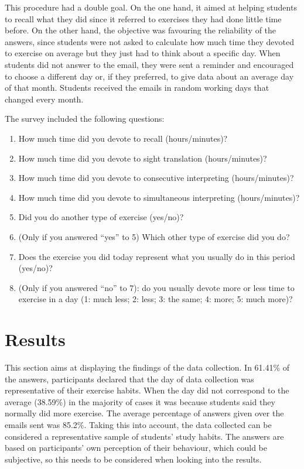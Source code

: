 \documentclass[output=paper]{../langscibook}
\begin{document}
This procedure had a double goal. On the one hand, it aimed at helping students to recall what they did since it referred to exercises they had done little time before. On the other hand, the objective was favouring the reliability of the answers, since students were not asked to calculate how much time they devoted to exercise on average but they just had to think about a specific day. When students did not answer to the email, they were sent a reminder and encouraged to choose a different day or, if they preferred, to give data about an average day of that month. Students received the emails in random working days that changed every month.

The survey included the following questions:

\begin{enumerate}[noitemsep]
\item How much time did you devote to recall (hours/minutes)?
\item How much time did you devote to sight translation (hours/minutes)?
\item How much time did you devote to consecutive interpreting (hours/minutes)?
\item How much time did you devote to simultaneous interpreting (hours/minutes)?
\item Did you do another type of exercise (yes/no)?
\item (Only if you answered ``yes'' to 5) Which other type of exercise did you do?
\item Does the exercise you did today represent what you usually do in this period (yes/no)?
\item (Only if you answered ``no'' to 7): do you usually devote more or less time to exercise in a day (1: much less; 2: less; 3: the same; 4: more; 5: much more)?
\end{enumerate}



\section{Results}


This section aims at displaying the findings of the data collection. In 61.41\% of the answers, participants declared that the day of data collection was representative of their exercise habits. When the day did not correspond to the average (38.59\%) in the majority of cases it was because students said they normally did more exercise. The average percentage of answers given over the emails sent was 85.2\%. Taking this into account, the data collected can be considered a representative sample of students’ study habits. The answers are based on participants’ own perception of their behaviour, which could be subjective, so this needs to be considered when looking into the results.
\end{document}
